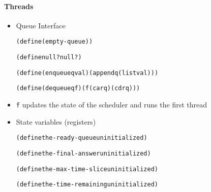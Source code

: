 \documentclass{beamer}
\newcommand{\elist}{\texttt{\textquotesingle{()}}}
\newcommand{\quot}{\texttt{\textquotesingle{}}}
\begin{document}
\begin{frame}[fragile]
\framesubtitle{Threads}
\begin{scriptsize}
\begin{itemize}
\item<1-> Queue Interface
\begin{alltt}
(define (empty-queue) \elist{})

(define null? null?)

(define (enqueue q val) (append q (list val)))

(define (dequeue q f) (f (car q) (cdr q)))
\end{alltt}

\item<1-> \texttt{f} updates the state of the scheduler and runs the first thread

\item<2-> State variables (registers)
\begin{alltt}
(define the-ready-queue    \quot{}uninitialized)

(define the-final-answer   \quot{}uninitialized)

(define the-max-time-slice \quot{}uninitialized)

(define the-time-remaining \quot{}uninitialized)
\end{alltt}

\end{itemize}
\end{scriptsize}
\end{frame}
\end{document}

